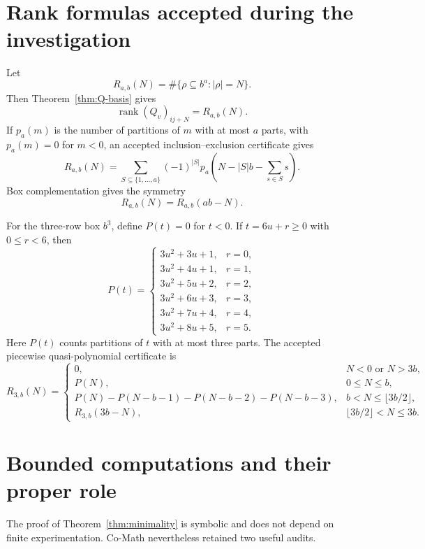 \documentclass[11pt]{amsart}
\theoremstyle{definition}
\theoremstyle{remark}
\begin{document}
\section{Rank formulas accepted during the investigation}

Let
\[
  R_{a,b}(N)=\#\{\rho\subseteq b^a:|\rho|=N\}.
\]
Then Theorem~\ref{thm:Q-basis} gives
\[
  \operatorname{rank}(Q_v)_{ij+N}=R_{a,b}(N).
\]
If $p_a(m)$ is the number of partitions of $m$ with at most $a$ parts, with
$p_a(m)=0$ for $m<0$, an accepted inclusion--exclusion certificate gives
\begin{equation}\label{eq:rank-ie}
  R_{a,b}(N)
  =\sum_{S\subseteq\{1,\ldots,a\}}
    (-1)^{|S|}
    p_a\!\left(N-|S|b-\sum_{s\in S}s\right).
\end{equation}
Box complementation gives the symmetry
\[
  R_{a,b}(N)=R_{a,b}(ab-N).
\]

For the three-row box $b^3$, define $P(t)=0$ for $t<0$.  If
$t=6u+r\geq0$ with $0\leq r<6$, then
\[
P(t)=
\begin{cases}
3u^2+3u+1,&r=0,\\
3u^2+4u+1,&r=1,\\
3u^2+5u+2,&r=2,\\
3u^2+6u+3,&r=3,\\
3u^2+7u+4,&r=4,\\
3u^2+8u+5,&r=5.
\end{cases}
\]
Here $P(t)$ counts partitions of $t$ with at most three parts.  The accepted
piecewise quasi-polynomial certificate is
\[
R_{3,b}(N)=
\begin{cases}
0,&N<0\text{ or }N>3b,\\
P(N),&0\leq N\leq b,\\
P(N)-P(N-b-1)-P(N-b-2)-P(N-b-3),
  &b<N\leq\lfloor3b/2\rfloor,\\
R_{3,b}(3b-N),&\lfloor3b/2\rfloor<N\leq3b.
\end{cases}
\]

\section{Bounded computations and their proper role}

The proof of Theorem~\ref{thm:minimality} is symbolic and does not depend on
finite experimentation.  Co-Math nevertheless retained two useful audits.
\end{document}
